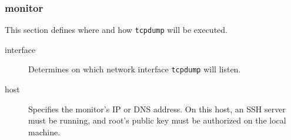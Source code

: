 \subsubsection{monitor}

\noindent
This section defines where and how \verb|tcpdump| will be executed.
\begin{description}
	\item[interface]
		Determines on which network interface \verb|tcpdump| will listen.

	\item[host]
		Specifies the monitor's IP or DNS address.
		On this host, an SSH server must be running, and root's public key must be authorized on the local machine.
\end{description}


